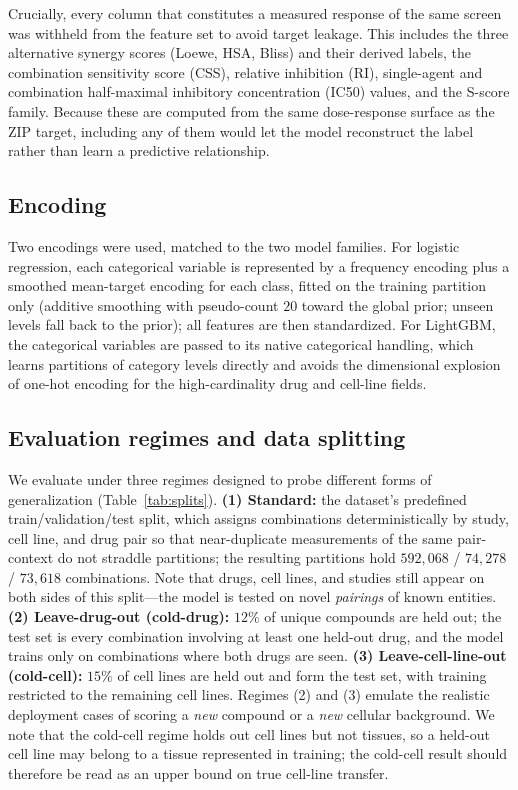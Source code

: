 \documentclass[11pt]{article}
\begin{document}
Crucially, every column that constitutes a measured response of the same screen was withheld from the
feature set to avoid target leakage. This includes the three alternative synergy scores (Loewe, HSA,
Bliss) and their derived labels, the combination sensitivity score (CSS), relative inhibition (RI),
single-agent and combination half-maximal inhibitory concentration (IC50) values, and the S-score
family. Because these are computed from the same dose-response surface as the ZIP target, including any
of them would let the model reconstruct the label rather than learn a predictive relationship.

\subsection{Encoding}
Two encodings were used, matched to the two model families. For logistic regression, each categorical
variable is represented by a frequency encoding plus a smoothed mean-target encoding for each class,
fitted on the training partition only (additive smoothing with pseudo-count $20$ toward the global
prior; unseen levels fall back to the prior); all features are then standardized. For LightGBM, the
categorical variables are passed to its native categorical handling, which learns partitions of
category levels directly and avoids the dimensional explosion of one-hot encoding for the
high-cardinality drug and cell-line fields.

\subsection{Evaluation regimes and data splitting}
We evaluate under three regimes designed to probe different forms of generalization
(Table~\ref{tab:splits}). \textbf{(1) Standard:} the dataset's predefined train/validation/test split,
which assigns combinations deterministically by study, cell line, and drug pair so that near-duplicate
measurements of the same pair-context do not straddle partitions; the resulting partitions hold
$592{,}068$ / $74{,}278$ / $73{,}618$ combinations. Note that drugs, cell lines, and studies still
appear on both sides of this split---the model is tested on novel \emph{pairings} of known entities.
\textbf{(2) Leave-drug-out (cold-drug):} $12\%$ of unique compounds are held out; the test set is every
combination involving at least one held-out drug, and the model trains only on combinations where both
drugs are seen. \textbf{(3) Leave-cell-line-out (cold-cell):} $15\%$ of cell lines are held out and form
the test set, with training restricted to the remaining cell lines. Regimes (2) and (3) emulate the
realistic deployment cases of scoring a \emph{new} compound or a \emph{new} cellular background. We
note that the cold-cell regime holds out cell lines but not tissues, so a held-out cell line may belong
to a tissue represented in training; the cold-cell result should therefore be read as an upper bound on
true cell-line transfer.
\end{document}
